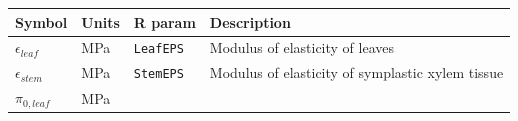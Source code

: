\documentclass[]{book}
\begin{document}
\begin{longtable}[]{@{}llll@{}}
\toprule
\begin{minipage}[b]{0.11\columnwidth}\raggedright\strut
Symbol\strut
\end{minipage} & \begin{minipage}[b]{0.10\columnwidth}\raggedright\strut
Units\strut
\end{minipage} & \begin{minipage}[b]{0.12\columnwidth}\raggedright\strut
R param\strut
\end{minipage} & \begin{minipage}[b]{0.45\columnwidth}\raggedright\strut
Description\strut
\end{minipage}\tabularnewline
\midrule
\endhead
\begin{minipage}[t]{0.11\columnwidth}\raggedright\strut
\(\epsilon_{leaf}\)\strut
\end{minipage} & \begin{minipage}[t]{0.10\columnwidth}\raggedright\strut
MPa\strut
\end{minipage} & \begin{minipage}[t]{0.12\columnwidth}\raggedright\strut
\texttt{LeafEPS}\strut
\end{minipage} & \begin{minipage}[t]{0.45\columnwidth}\raggedright\strut
Modulus of elasticity of leaves\strut
\end{minipage}\tabularnewline
\begin{minipage}[t]{0.11\columnwidth}\raggedright\strut
\(\epsilon_{stem}\)\strut
\end{minipage} & \begin{minipage}[t]{0.10\columnwidth}\raggedright\strut
MPa\strut
\end{minipage} & \begin{minipage}[t]{0.12\columnwidth}\raggedright\strut
\texttt{StemEPS}\strut
\end{minipage} & \begin{minipage}[t]{0.45\columnwidth}\raggedright\strut
Modulus of elasticity of symplastic xylem tissue\strut
\end{minipage}\tabularnewline
\begin{minipage}[t]{0.11\columnwidth}\raggedright\strut
\(\pi_{0,leaf}\)\strut
\end{minipage} & \begin{minipage}[t]{0.10\columnwidth}\raggedright\strut
MPa\strut
\end{minipage} & \begin{minipage}[t]{0.12\columnwidth}\raggedright\strut

\end{minipage}
\end{longtable}
\end{document}
